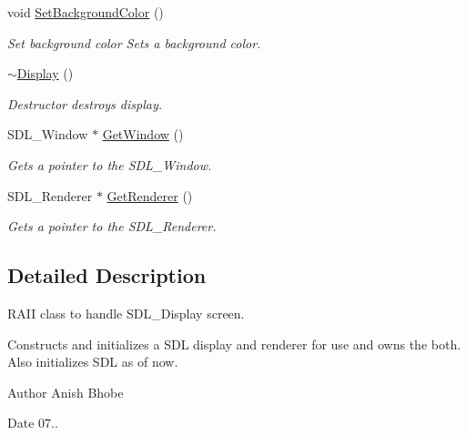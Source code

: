 \begin{DoxyCompactItemize}
\mbox{\label{classinferno_1_1graphics_1_1_display_a069358cb752031b94ff7a8439aa5ccd3}} 
void \mbox{\hyperlink{classinferno_1_1graphics_1_1_display_a069358cb752031b94ff7a8439aa5ccd3}{Set\+Background\+Color}} ()
\begin{DoxyCompactList}\small\item\em Set background color Sets a background color. \end{DoxyCompactList}\item 
\mbox{\label{classinferno_1_1graphics_1_1_display_a4dacb6972222af9e140aa3c71ce05190}} 
\mbox{\hyperlink{classinferno_1_1graphics_1_1_display_a4dacb6972222af9e140aa3c71ce05190}{$\sim$\+Display}} ()
\begin{DoxyCompactList}\small\item\em Destructor destroys display. \end{DoxyCompactList}\item 
S\+D\+L\+\_\+\+Window $\ast$ \mbox{\hyperlink{classinferno_1_1graphics_1_1_display_ae3eda38c23eae8e2d49bfab0ef3e2f6c}{Get\+Window}} ()
\begin{DoxyCompactList}\small\item\em Gets a pointer to the S\+D\+L\+\_\+\+Window. \end{DoxyCompactList}\item 
S\+D\+L\+\_\+\+Renderer $\ast$ \mbox{\hyperlink{classinferno_1_1graphics_1_1_display_a6b2bd638d5f6b07b4a5cfad4a04fab41}{Get\+Renderer}} ()
\begin{DoxyCompactList}\small\item\em Gets a pointer to the S\+D\+L\+\_\+\+Renderer. \end{DoxyCompactList}\end{DoxyCompactItemize}


\subsection{Detailed Description}
R\+A\+II class to handle S\+D\+L\+\_\+\+Display screen. 

Constructs and initializes a S\+DL display and renderer for use and owns the both. Also initializes S\+DL as of now. \begin{DoxyAuthor}{Author}
Anish Bhobe 
\end{DoxyAuthor}
\begin{DoxyDate}{Date}
07.. 
\end{DoxyDate}


